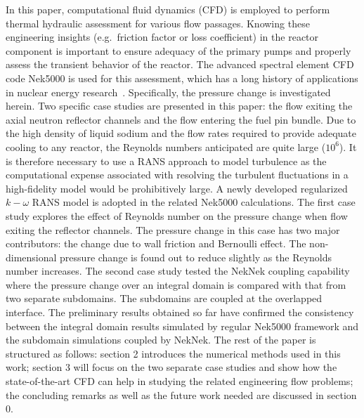 \documentclass[11pt,letterpaper,english]{article}
\begin{document}
In this paper, computational fluid dynamics (CFD) is employed to perform thermal hydraulic assessment for various flow passages. 
Knowing these engineering insights (e.g.\ friction factor or loss coefficient) in the reactor component is important to ensure adequacy of the primary pumps and properly assess the transient behavior of the reactor. 
The advanced spectral element CFD code Nek5000 is used for this assessment, which has a long history of applications in nuclear energy research~\citep{Merzari2012,Fick2017,Shaver2019,Yildiz2019,Merzari2019}. 
Specifically, the pressure change is investigated herein. 
Two specific case studies are presented in this paper: the flow exiting the axial neutron reflector channels and the flow entering the fuel pin bundle. 
Due to the high density of liquid sodium and the flow rates required to provide adequate cooling to any reactor, the Reynolds numbers anticipated are quite large ($10^6$). 
It is therefore necessary to use a RANS approach to model turbulence as the computational expense associated with resolving the turbulent fluctuations in a high-fidelity model would be prohibitively large. 
A newly developed regularized $k-\omega$ RANS model is adopted in the related Nek5000 calculations. 
The first case study explores the effect of Reynolds number on the pressure change when flow exiting the reflector channels. 
The pressure change in this case has two major contributors: the change due to wall friction and Bernoulli effect. 
The non-dimensional pressure change is found out to reduce slightly as the Reynolds number increases. 
The second case study tested the NekNek coupling capability where the pressure change over an integral domain is compared with that from two separate subdomains. 
The subdomains are coupled at the overlapped interface. 
The preliminary results obtained so far have confirmed the consistency between the integral domain results simulated by regular Nek5000 framework and the subdomain simulations coupled by NekNek. 
The rest of the paper is structured as follows: section 2 introduces the numerical methods used in this work; section 3 will focus on the two separate case studies and show how the state-of-the-art CFD can help in studying the related engineering flow problems; the concluding remarks as well as the future work needed are discussed in section 0. 






\end{document}
